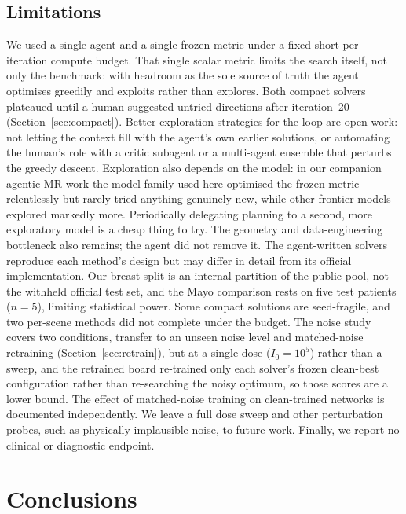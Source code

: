 \documentclass[AMA,twocolumn]{USG} %
\begin{document}
\subsection{Limitations}\label{sec:limits}

We used a single agent and a single frozen metric under a fixed short per-iteration compute budget. That single scalar metric limits the search itself, not only the benchmark: with headroom as the sole source of truth the agent optimises greedily and exploits rather than explores. Both compact solvers plateaued until a human suggested untried directions after iteration~20 (Section~\ref{sec:compact}). Better exploration strategies for the loop are open work: not letting the context fill with the agent's own earlier solutions, or automating the human's role with a critic subagent or a multi-agent ensemble that perturbs the greedy descent. Exploration also depends on the model: in our companion agentic MR work\cite{zaiss2026agent4mr} the model family used here optimised the frozen metric relentlessly but rarely tried anything genuinely new, while other frontier models explored markedly more. Periodically delegating planning to a second, more exploratory model is a cheap thing to try. The geometry and data-engineering bottleneck also remains; the agent did not remove it. The agent-written solvers reproduce each method's design but may differ in detail from its official implementation. Our breast split is an internal partition of the public pool, not the withheld official test set, and the Mayo comparison rests on five test patients ($n=5$), limiting statistical power. Some compact solutions are seed-fragile, and two per-scene methods did not complete under the budget. The noise study covers two conditions, transfer to an unseen noise level and matched-noise retraining (Section~\ref{sec:retrain}), but at a single dose ($I_0=10^5$) rather than a sweep, and the retrained board re-trained only each solver's frozen clean-best configuration rather than re-searching the noisy optimum, so those scores are a lower bound. The effect of matched-noise training on clean-trained networks is documented independently.\cite{huang2018some} We leave a full dose sweep and other perturbation probes, such as physically implausible noise, to future work. Finally, we report no clinical or diagnostic endpoint.

\section{Conclusions}\label{sec:conclusions}
\end{document}
